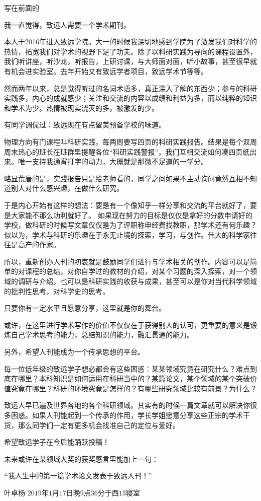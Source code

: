 \documentclass[12pt]{article}
\begin{document}
\begin{center}
   \Huge 写在前面的
\end{center}


我一直觉得，致远人需要一个学术期刊。

本人于2016年进入致远学院。大一的时候我深切地感到学院为了激发我们对科学的热情，拓宽我们对学术的视野下足了功夫。除了以科研实践为导向的课程设置外，我们听讲座，听沙龙，听报告，上研讨课，与大师面对面，听小故事，甚至很早就有机会进实验室。去年开始又有致远学者项目，致远学术节等等。

然而两年以来，总是觉得听过的名词术语多，真正深入了解的东西少；参与的科研实践多，内心的成就感少；关注和交流的内容以成绩和利益为多，而以纯粹的知识和学术为少。热情被现实浇灭的多，被激发的少。

有同学调侃过：致远现在有点留美预备学校的味道。

物理方向有门课程叫科研实践，每两周要写四页的科研实践报告。结果是每个双周周末热心的班长在班群里提醒各位“科研实践警报”，我们互相交流如何凑四页纸出来。唯一支持我通宵打字的动力，大概就是那微不足道的一学分。

略显荒唐的是，实践报告只是给老师看的，同学之间如果不主动询问竟然互相不知道别人对什么感兴趣，在做什么研究。

于是内心开始有这样的想法：要是有一个像知乎一样分享和交流的平台就好了，要是大家能不那么功利就好了。
如果现在努力的目标是仅仅是拿好的分数申请好的学校，做科研的时候写文章仅仅是为了评职称申经费找教职，那学术还有何乐趣？
似以为，学术与科研的乐趣在于永无止境的探索，学习，与创作。伟大的科学家往往是高产的作家。

所以，重新创办人刊的初衷就是鼓励同学们进行与学术相关的创作。内容可以是简单的对课程的总结，对你自学过的教材的介绍，对某个习题的深入探索，对一个领域的调研与介绍，也可以是科研实践的收获与成果，甚至可以是你对当代科学领域的批判性思考，对科学史的思考。

只要你有一定水平且愿意分享，这里就是你的舞台。

或许，在这里进行学术写作的价值不仅仅在于获得别人的认可，更重要的意义是锻炼自己学术思考的能力，总结知识的能力，融汇贯通的能力。

另外，希望人刊能成为一个传承思想的平台。

每一位低年级的致远学子想必都会有这些困惑：某某领域究竟在研究什么？难点到底在哪里？本科知识是如何运用在科研当中的？某篇论文，某个领域的某个突破价值究竟在哪里？科研的环境究竟是怎样的？有哪些研究领域比较有前景？为什么？

致远人早已遍及世界各地的各个科研领域。其实有的时候一篇文章就可以解决你很多困惑。如果人刊能起到一个传承的作用，学长学姐愿意分享这些正宗的学术干货，那么同学们一定有更多机会找准自己的定位与爱好。

希望致远学子在今后能踊跃投稿！

未来或许在某领域大奖的获奖感言里能加上一句：
\begin{center}
  \textbf
  “我人生中的第一篇学术论文发表于致远人刊！”
\end{center}

叶卓杨 $2019$年$1$月$17$日晚$9$点$36$分于西$13$寝室
\end{document}
